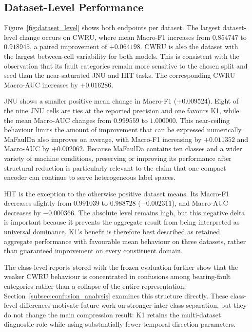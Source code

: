 \subsection{Dataset-Level Performance}
\label{subsec:dataset_results}





Figure~\ref{fig:dataset_level} shows both endpoints per dataset. The largest dataset-level change occurs on CWRU, where mean Macro-F1 increases from $0.854747$ to $0.918945$, a paired improvement of $+0.064198$. CWRU is also the dataset with the largest between-cell variability for both models. This is consistent with the observation that its fault categories remain more sensitive to the chosen split and seed than the near-saturated JNU and HIT tasks. The corresponding CWRU Macro-AUC increases by $+0.016286$.

JNU shows a smaller positive mean change in Macro-F1 ($+0.009524$). Eight of the nine JNU cells are ties at the reported precision and one favours K1, while the mean Macro-AUC changes from $0.999559$ to $1.000000$. This near-ceiling behaviour limits the amount of improvement that can be expressed numerically. MaFaulDa also improves on average, with Macro-F1 increasing by $+0.011352$ and Macro-AUC by $+0.002062$. Because MaFaulDa contains ten classes and a wider variety of machine conditions, preserving or improving its performance after structural reduction is particularly relevant to the claim that one compact encoder can continue to serve heterogeneous label spaces.

HIT is the exception to the otherwise positive dataset means. Its Macro-F1 decreases slightly from $0.991039$ to $0.988728$ ($-0.002311$), and Macro-AUC decreases by $-0.000366$. The absolute level remains high, but this negative delta is important because it prevents the aggregate result from being interpreted as universal dominance. K1's benefit is therefore best described as retained aggregate performance with favourable mean behaviour on three datasets, rather than guaranteed improvement on every constituent domain.

The class-level reports stored with the frozen evaluation further show that the weaker CWRU behaviour is concentrated in confusions among bearing-fault categories rather than a collapse of the entire representation; Section~\ref{subsec:confusion_analysis} examines this structure directly. These class-level differences motivate future work on stronger inter-class separation, but they do not change the main compression result: K1 retains the multi-dataset diagnostic role while using substantially fewer temporal-direction parameters.

